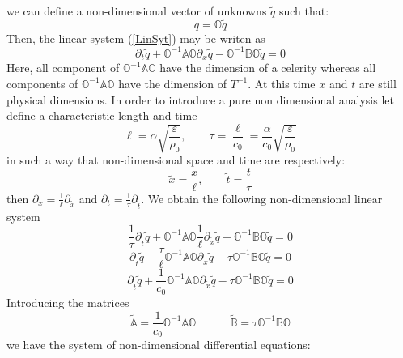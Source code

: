 \documentclass[
10pt, %
a4paper, %
oneside, %
headinclude,footinclude, %
table
]{scrartcl}
\begin{document}
we can define a non-dimensional vector of unknowns $\tilde{q}$ such that:
\begin{equation}
q=\mathbb{O}\tilde{q}
\end{equation}
Then, the linear system (\ref{LinSyt}) may be writen as 
\begin{equation}
\partial_{t}\tilde{q}+\mathbb{O}^{-1}\mathbb{A}\mathbb{O}\partial_{x}\tilde{q}-\mathbb{O}^{-1}\mathbb{B}\mathbb{O}\tilde{q}=0
\end{equation}
Here, all component of $\mathbb{O}^{-1}\mathbb{A}\mathbb{O}$ have the dimension of a celerity whereas all components of  $\mathbb{O}^{-1}\mathbb{A}\mathbb{O}$ have the dimension of $T^{-1}$. At this time $x$ and $t$ are still physical dimensions. In order to introduce a pure non dimensional analysis let define a characteristic length and time 
\begin{equation}\label{CharacteristicSize}
\ell=\alpha  \sqrt{\frac{\varepsilon}{\rho_{0}}}, \quad\quad \tau=\frac{\ell}{c_{0}}=\frac{\alpha}{c_{0}}  \sqrt{\frac{\varepsilon}{\rho_{0}}}
\end{equation}
in such a way that non-dimensional space and time are respectively:
\begin{equation}\label{Rescaling}
\tilde{x}=\frac{x}{\ell}, \quad\quad	\tilde{t}=\frac{t}{\tau}
\end{equation}
then $\partial_{x}=\frac{1}{\ell}\partial_{\tilde{x}}$ and $\partial_{t}=\frac{1}{\tau}\partial_{\tilde{t}}$. We obtain the following non-dimensional linear system 
\begin{equation}
\frac{1}{\tau}\partial_{\tilde{t}}\tilde{q}+\mathbb{O}^{-1}\mathbb{A}\mathbb{O}\frac{1}{\ell}\partial_{\tilde{x}}\tilde{q}-\mathbb{O}^{-1}\mathbb{B}\mathbb{O}\tilde{q}=0
\end{equation}
\begin{equation}
\partial_{\tilde{t}}\tilde{q}+\frac{\tau}{\ell}\mathbb{O}^{-1}\mathbb{A}\mathbb{O}\partial_{\tilde{x}}\tilde{q}-\tau \mathbb{O}^{-1}\mathbb{B}\mathbb{O}\tilde{q}=0
\end{equation}
\begin{equation}
\partial_{\tilde{t}}\tilde{q}+\frac{1}{c_{0}}\mathbb{O}^{-1}\mathbb{A}\mathbb{O}\partial_{\tilde{x}}\tilde{q}-\tau \mathbb{O}^{-1}\mathbb{B}\mathbb{O}\tilde{q}=0
\end{equation}
Introducing the matrices
$$
\tilde{\mathbb{A}} = \frac{1}{c_{0}}\mathbb{O}^{-1}\mathbb{A}\mathbb{O}
\quad\quad\quad
\tilde{\mathbb{B}} = \tau\mathbb{O}^{-1}\mathbb{B}\mathbb{O}
$$
we have the system of non-dimensional differential equations:
\end{document}
